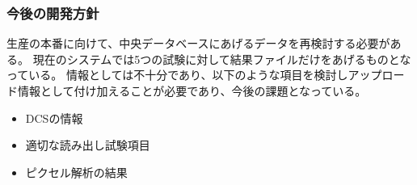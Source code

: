 \subsubsection{今後の開発方針}

生産の本番に向けて、中央データベースにあげるデータを再検討する必要がある。
現在のシステムでは5つの試験に対して結果ファイルだけをあげるものとなっている。
情報としては不十分であり、以下のような項目を検討しアップロード情報として付け加えることが必要であり、今後の課題となっている。

\begin{itemize}
  \item DCSの情報
  \item 適切な読み出し試験項目
  \item ピクセル解析の結果
\end{itemize}

